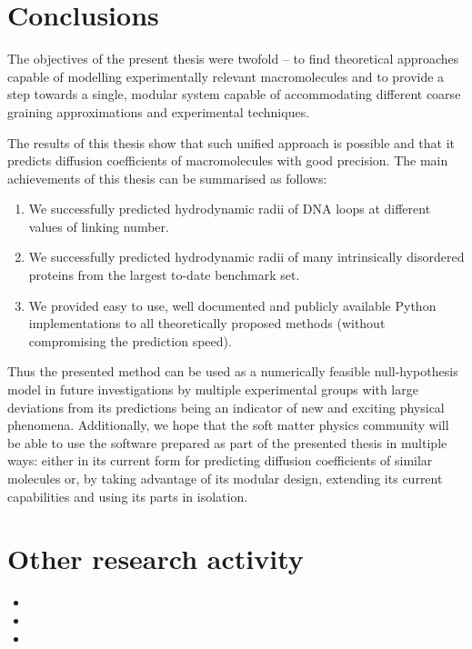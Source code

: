 \documentclass{doctoral}
\begin{document}
\chapter{Conclusions}

The objectives of the present thesis were twofold -- to find theoretical approaches capable of modelling experimentally relevant macromolecules and to provide a step towards a single, modular system capable of accommodating different coarse graining approximations and experimental techniques.

The results of this thesis show that such unified approach is possible and that it predicts diffusion coefficients of macromolecules with good precision.
The main achievements of this thesis can be summarised as follows:
\begin{enumerate}
    \item We successfully predicted hydrodynamic radii of DNA loops at different values of linking number.
    \item We successfully predicted hydrodynamic radii of many intrinsically disordered proteins from the largest to-date benchmark set.
    \item We provided easy to use, well documented and publicly available Python implementations to all theoretically proposed methods (without compromising the prediction speed).
\end{enumerate}

Thus the presented method can be used as a numerically feasible null-hypothesis model in future investigations by multiple experimental groups with large deviations from its predictions being an indicator of new and exciting physical phenomena.
Additionally, we hope that the soft matter physics community will be able to use the software prepared as part of the presented thesis in multiple ways: either in its current form for predicting diffusion coefficients of similar molecules or, by taking advantage of its modular design, extending its current capabilities and using its parts in isolation.

\appendix

\chapter{Other research activity}
\begin{itemize}
    \item {}
    \item {}
    \item {}
\end{itemize}

\printbibliography[heading=bibchapter]
\end{document}

